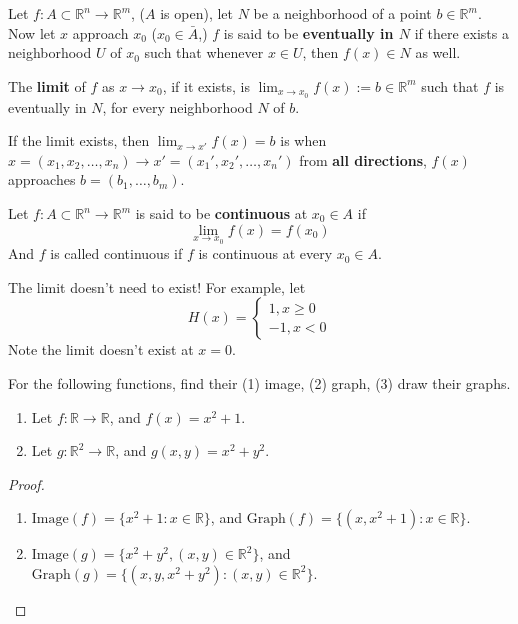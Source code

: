 \documentclass[openany]{book}
\newcommand{\R}{\mathbb{R}}
\begin{document}
\begin{defn}[limit]
    Let $f: A\subset\R^n\to\R^m$, ($A$ is open), let $N$ be a neighborhood of a point $b\in\R^m$. Now let $x$ approach $x_0$ ($x_0\in\bar{A}$,) $f$ is said to be \textbf{eventually in $N$} if there exists a neighborhood $U$ of $x_0$ such that whenever $x\in U$, then $f(x)\in N$ as well. 

    The \textbf{limit} of $f$ as $x\to x_0$, if it exists, is $\lim_{x\to x_0}f(x):=b\in\R^m$ such that $f$ is eventually in $N$, for every neighborhood $N$ of $b$. 
\end{defn}

\begin{defn}[limit']
    If the limit exists, then $\lim_{x\to x'}f(x)=b$ is when $x=(x_1, x_2, \dots, x_n)\to x'=(x_1',x_2',\dots, x_n')$ from \textbf{all directions}, $f(x)$ approaches $b=(b_1,\dots, b_m)$.
\end{defn}



\begin{defn}[continuity]
    Let $f:A\subset\R^n\to\R^m$ is said to be \textbf{continuous} at $x_0\in A$ if 
    \begin{equation*}
        \lim_{x\to x_0}f(x)=f(x_0)
    \end{equation*}
    And $f$ is called continuous if $f$ is continuous at every $x_0\in A$.
\end{defn}

\begin{example}
    The limit doesn't need to exist! For example, let 
    \begin{equation*}
        H(x)=\begin{cases}
            1, x\geq 0\\
            -1, x<0
        \end{cases}
    \end{equation*}
    Note the limit doesn't exist at $x=0$.
\end{example}




\begin{prob}
    For the following functions, find their (1) image, (2) graph, (3) draw their graphs.
    \begin{enumerate}
        \item  Let $f: \R\to\R$, and $f(x)=x^2+1$.
        \item Let $g: \R^2\to \R$, and $g(x,y)=x^2+y^2$.
    \end{enumerate}
\end{prob}
\begin{proof}
    \begin{enumerate}
        \item $\text{Image}(f)=\{x^2+1: x\in\R\}$, and $\text{Graph}(f)=\{(x,x^2+1):x\in\R\}$.
        \item $\text{Image}(g)=\{x^2+y^2, (x,y)\in\R^2\}$, and $\text{Graph}(g)=\{(x,y,x^2+y^2):(x,y)\in\R^2\}$.
    \end{enumerate}
\end{proof}
\end{document}
